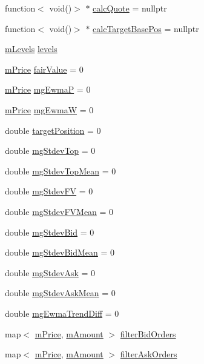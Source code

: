 \begin{DoxyCompactItemize}
\item 
function$<$ void()$>$ $\ast$ \hyperlink{class_k_1_1_m_g_a62d2cf6a8a40f2b9f3671e89416b09e1}{calc\+Quote} = nullptr
\item 
function$<$ void()$>$ $\ast$ \hyperlink{class_k_1_1_m_g_a427f330e901dc47bf84fd9fe98590924}{calc\+Target\+Base\+Pos} = nullptr
\item 
\hyperlink{struct_k_1_1m_levels}{m\+Levels} \hyperlink{class_k_1_1_m_g_a1ff20b3cba9c009511bea1c21952a5ee}{levels}
\item 
\hyperlink{km_8h_a392f9b7f384aa3539bbb890b059f5b8c}{m\+Price} \hyperlink{class_k_1_1_m_g_a68046d94c62e77cce36ea7de25b7927d}{fair\+Value} = 0
\item 
\hyperlink{km_8h_a392f9b7f384aa3539bbb890b059f5b8c}{m\+Price} \hyperlink{class_k_1_1_m_g_ae990143af8448b62f44b2b2d7787eebc}{mg\+EwmaP} = 0
\item 
\hyperlink{km_8h_a392f9b7f384aa3539bbb890b059f5b8c}{m\+Price} \hyperlink{class_k_1_1_m_g_ad9e670e4f0b6caf6a5a8d8ee23acf178}{mg\+EwmaW} = 0
\item 
double \hyperlink{class_k_1_1_m_g_a413889c063d487f39908c7c777096aa1}{target\+Position} = 0
\item 
double \hyperlink{class_k_1_1_m_g_ac4451d8294cb8944c256971e1acb775b}{mg\+Stdev\+Top} = 0
\item 
double \hyperlink{class_k_1_1_m_g_abf4a6e034d5cf8359ada9f8344b0f469}{mg\+Stdev\+Top\+Mean} = 0
\item 
double \hyperlink{class_k_1_1_m_g_a47f0036553b72247f6754ceddb5c113b}{mg\+Stdev\+FV} = 0
\item 
double \hyperlink{class_k_1_1_m_g_a020f609af7e4ab045b64ca49a8db4f44}{mg\+Stdev\+F\+V\+Mean} = 0
\item 
double \hyperlink{class_k_1_1_m_g_a3c10d311c08f2978192402d961cc32aa}{mg\+Stdev\+Bid} = 0
\item 
double \hyperlink{class_k_1_1_m_g_a6eb5979883c311c60b4c02f8faa20185}{mg\+Stdev\+Bid\+Mean} = 0
\item 
double \hyperlink{class_k_1_1_m_g_a30c5f31a2b624ae505d3b371286a283b}{mg\+Stdev\+Ask} = 0
\item 
double \hyperlink{class_k_1_1_m_g_a573fe2cde6d4be29b8adb62d9c6df216}{mg\+Stdev\+Ask\+Mean} = 0
\item 
double \hyperlink{class_k_1_1_m_g_acd339134ddd47c67ddd7c3a8acdf7b3c}{mg\+Ewma\+Trend\+Diff} = 0
\item 
map$<$ \hyperlink{km_8h_a392f9b7f384aa3539bbb890b059f5b8c}{m\+Price}, \hyperlink{km_8h_ad4d00888c55a47a8a40ed8020d176086}{m\+Amount} $>$ \hyperlink{class_k_1_1_m_g_a7b79b121faa31d26dcd1d6e3fb9a6b24}{filter\+Bid\+Orders}
\item 
map$<$ \hyperlink{km_8h_a392f9b7f384aa3539bbb890b059f5b8c}{m\+Price}, \hyperlink{km_8h_ad4d00888c55a47a8a40ed8020d176086}{m\+Amount} $>$ \hyperlink{class_k_1_1_m_g_aa30d4938235eda21a76452fd71e10ae7}{filter\+Ask\+Orders}
\end{DoxyCompactItemize}
